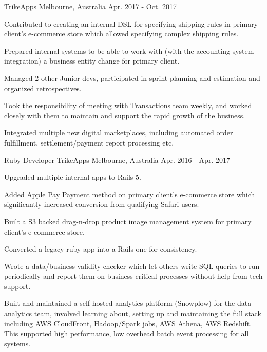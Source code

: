 \begin{cventries}
    {TrikeApps} %
    {Melbourne, Australia} %
    {Apr. 2017 - Oct. 2017} %
    {
      \begin{cvitems} %
        \item {Contributed to creating an internal DSL for specifying shipping rules in primary client's e-commerce store which allowed specifying complex shipping rules.}
        \item {Prepared internal systems to be able to work with (with the accounting system integration) a business entity change for primary client.}
        \item {Managed 2 other Junior devs, participated in sprint planning and estimation and organized retrospectives.}
        \item {Took the responsibility of meeting with Transactions team weekly, and worked closely with them to maintain and support the rapid growth of the business.}
        \item {Integrated multiple new digital marketplaces, including automated order fulfillment, settlement/payment report processing etc.}
      \end{cvitems}
    }
  \cventry
    {Ruby Developer} %
    {TrikeApps} %
    {Melbourne, Australia} %
    {Apr. 2016 - Apr. 2017} %
    {
      \begin{cvitems} %
        \item {Upgraded multiple internal apps to Rails 5.}
        \item {Added Apple Pay Payment method on primary client's e-commerce store which significantly increased conversion from qualifying Safari users.}
        \item {Built a S3 backed drag-n-drop product image management system for primary client's e-commerce store.}
        \item {Converted a legacy ruby app into a Rails one for consistency.}
        \item {Wrote a data/business validity checker which let others write SQL queries to run periodically and report them on business critical processes without help from tech support.}
        \item {Built and maintained a self-hosted analytics platform (Snowplow) for the data analytics team, involved learning about, setting up and maintaining the full stack including AWS CloudFront, Hadoop/Spark jobs, AWS Athena, AWS Redshift. This supported high performance, low overhead batch event processing for all systems.}

\end{cvitems}}
\end{cventries}
